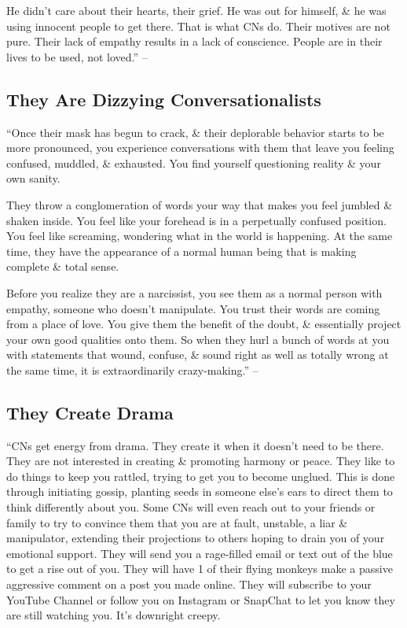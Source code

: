 \documentclass{article}
\numberwithin{equation}{section}
\begin{document}
He didn't care about their hearts, their grief. He was out for himself, \& he was using innocent people to get there. That is what CNs do. Their motives are not pure. Their lack of empathy results in a lack of conscience. People are in their lives to be used, not loved.'' -- \cite[p. 67]{Mirza2017}

\subsection{They Are Dizzying Conversationalists}
``Once their mask has begun to crack, \& their deplorable behavior starts to be more pronounced, you experience conversations with them that leave you feeling confused, muddled, \& exhausted. You find yourself questioning reality \& your own sanity.

They throw a conglomeration of words your way that makes you feel jumbled \& shaken inside. You feel like your forehead is in a perpetually confused position. You feel like screaming, wondering what in the world is happening. At the same time, they have the appearance of a normal human being that is making complete \& total sense.

Before you realize they are a narcissist, you see them as a normal person with empathy, someone who doesn't manipulate. You trust their words are coming from a place of love. You give them the benefit of the doubt, \& essentially project your own good qualities onto them. So when they hurl a bunch of words at you with statements that wound, confuse, \& sound right as well as totally wrong at the same time, it is extraordinarily crazy-making.'' -- \cite[p. 68]{Mirza2017}

\subsection{They Create Drama}
``CNs get energy from drama. They create it when it doesn't need to be there. They are not interested in creating \& promoting harmony or peace. They like to do things to keep you rattled, trying to get you to become unglued. This is done through initiating gossip, planting seeds in someone else's ears to direct them to think differently about you. Some CNs will even reach out to your friends or family to try to convince them that you are at fault, unstable, a liar \& manipulator, extending their projections to others hoping to drain you of your emotional support. They will send you a rage-filled email or text out of the blue to get a rise out of you. They will have 1 of their flying monkeys make a passive aggressive comment on a post you made online. They will subscribe to your YouTube Channel or follow you on Instagram or SnapChat to let you know they are still watching you. It's downright creepy.
\end{document}
